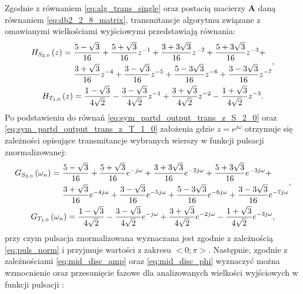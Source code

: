Zgodnie z równaniem \eqref{eq:alg_trans_single} oraz postacią macierzy $\mathbf{A}$ daną równaniem \eqref{eq:db2_2_8_matrix}, transmitancje algorytmu związane z omawianymi wielkościami wyjściowymi przedstawiają równania:
\begin{gather}
\begin{split}
H_{S_{2,0}} \left(z\right) = ~
& \frac{5 - \sqrt{3}}{16} + \frac{5 + \sqrt{3}}{16} z^{-1} + \frac{3 + 3 \sqrt{3}}{16} z^{-2} + \frac{5 + 3 \sqrt{3}}{16} z^{-3} + \\
& \frac{3 + \sqrt{3}}{16} z^{-4} + \frac{3 - \sqrt{3}}{16} z^{-5} + \frac{5 - 3 \sqrt{3}}{16} z^{-6} + \frac{3 - 3 \sqrt{3}}{16} z^{-7}
\end{split}
\label{eq:sym_partd_output_trans_z_S_2_0}, \\
H_{T_{1,0}} \left(z\right) = \frac{1 - \sqrt{3}}{4 \sqrt{2}} - \frac{3 - \sqrt{3}}{4 \sqrt{2}} z^{-1} + \frac{3 + \sqrt{3}}{4 \sqrt{2}} z^{-2} - \frac{1 + \sqrt{3}}{4 \sqrt{2}} z^{-3} \label{eq:sym_partd_output_trans_z_T_1_0}.
\end{gather}
Po podstawieniu do równań \eqref{eq:sym_partd_output_trans_z_S_2_0} oraz \eqref{eq:sym_partd_output_trans_z_T_1_0} założenia gdzie $z = e^{j\omega}$ otrzymuje się zależności opisujące transmitancje wybranych wierszy w funkcji pulsacji znormalizowanej:
\begin{gather}
\begin{split}
G_{S_{2,0}} \left(\omega_{n}\right) = ~
& \frac{5 - \sqrt{3}}{16} + \frac{5 + \sqrt{3}}{16} e^{-j\omega} + \frac{3 + 3 \sqrt{3}}{16} e^{-2j\omega} + \frac{5 + 3 \sqrt{3}}{16} e^{-3j\omega} + \\
& \frac{3 + \sqrt{3}}{16} e^{-4j\omega} + \frac{3 - \sqrt{3}}{16} e^{-5j\omega} + \frac{5 - 3 \sqrt{3}}{16} e^{-6j\omega} + \frac{3 - 3 \sqrt{3}}{16} e^{-7j\omega}
\end{split}
\label{eq:sym_partd_output_trans_wn_S_2_0}, \\
G_{T_{1,0}} \left(\omega_{n}\right) = \frac{1 - \sqrt{3}}{4 \sqrt{2}} - \frac{3 - \sqrt{3}}{4 \sqrt{2}} e^{-j\omega} + \frac{3 + \sqrt{3}}{4 \sqrt{2}} e^{-2j\omega} - \frac{1 + \sqrt{3}}{4 \sqrt{2}} e^{-3j\omega} \label{eq:sym_partd_output_trans_wn_T_1_0},
\end{gather}
przy czym pulsacja znormalizowana wyznaczana jest zgodnie z zależnością \eqref{eq:puls_norm} i przyjmuje wartości z zakresu $<0;\pi>$. Następnie, zgodnie z zależnościami \eqref{eq:mid_disc_amp} oraz \eqref{eq:mid_disc_phi} wyznaczyć można wzmocnienie oraz przesunięcie fazowe dla analizowanych wielkości wyjściowych w funkcji pulsacji \cite{proakis_dsp}:
